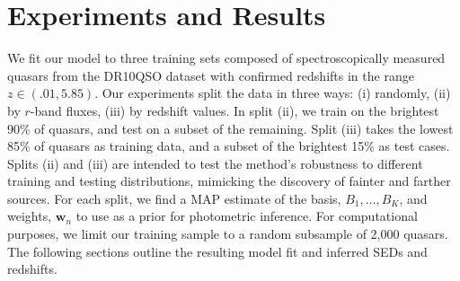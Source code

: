 \documentclass{article} %
\begin{document}




\section{Experiments and Results}
\label{sec:experiments}
We fit our model to three training sets composed of spectroscopically measured quasars from the DR10QSO dataset \cite{paris2014sloan} with confirmed redshifts in the range ${z \in (.01,  5.85)}$.  
Our experiments split the data in three ways: (i) randomly, (ii) by $r$-band fluxes, (iii) by redshift values.  In split (ii), we train on the brightest 90\% of quasars, and test on a subset of the remaining.  Split (iii) takes the lowest 85\% of quasars as training data, and a subset of the brightest 15\% as test cases.  Splits (ii) and (iii) are intended to test the method's robustness to different training and testing distributions, mimicking the discovery of fainter and farther sources.  
For each split, we find a MAP estimate of the basis, $B_1, \dots, B_K$, and weights, $\mathbf{w}_n$ to use as a prior for photometric inference.  For computational purposes, we limit our training sample to a random subsample of 2,000 quasars.   
The following sections outline the resulting model fit and inferred SEDs and redshifts. 
\end{document}
